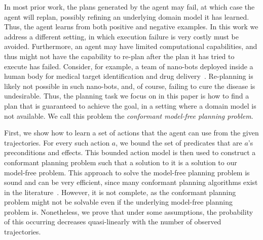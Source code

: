 \documentclass{article}
\newcommand{\MEMO}[1]
{ \fbox{
		\begin{minipage}[b]{7.9 cm}
			#1
		\end{minipage}
} }
\begin{document}
	
	In most prior work, the plans generated by the agent may fail, at which case the agent will replan, possibly refining an underlying domain model it has learned. Thus, the agent learns from both positive and negative examples. In this work we address a different setting, in which execution failure is very costly must be avoided. Furthermore, an agent may have limited computational capabilities, and thus might not have the capability to re-plan after the plan it has tried to execute has failed. 
	Consider, for example, a team of nano-bots deployed inside a human body for medical target identification and drug delivery~\cite{cavalcanti2007nanorobot}. Re-planning is likely not possible in such nano-bots, and, of course, failing to cure the disease is undesirable. Thus, the planning task we focus on in this paper is how to find a plan that is guaranteed to achieve the goal, in a setting where a domain model is not available. We call this problem the {\em conformant model-free planning problem}. 
	
	
	First, we show how to learn a set of actions that the agent can use from the given trajectories. 
	For every such action $a$, we bound the set of predicates that are $a$'s preconditions and effects. This bounded action model is then used  to construct a conformant planning problem such that a solution to it is a solution to our model-free problem. This approach to solve the model-free planning problem 
	is sound and can be very efficient, since many conformant planning algorithms exist in the literature~\cite{palacios2009compiling,hoffmann2006conformant}. 
	However, it is not complete, as the conformant planning problem might not be solvable even if the underlying model-free planning problem is. Nonetheless, we prove that under some assumptions, the probability of this occurring decreases quasi-linearly with the number of observed trajectories. %
	
	
\end{document}

